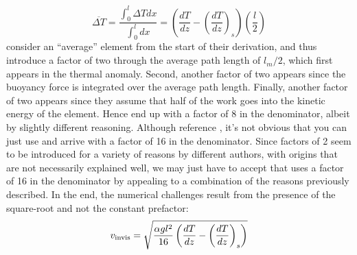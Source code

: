 \begin{equation}
\overline{\Delta T} = \frac{\int_0^l \Delta T dx}{\int_0^l dx} = \left( \frac{dT}{dz} - \left( \frac{dT}{dz} \right)_s \right) \left( \frac{l}{2} \right)
\end{equation}
\cite{KWW12} consider an ``average'' element from the start of their derivation, and thus introduce a factor of two through the average path length of $l_m/2$, which first appears in the thermal anomaly.  Second, another factor of two appears since the buoyancy force is integrated over the average path length.  Finally, another factor of two appears since they assume that half of the work goes into the kinetic energy of the element.  Hence \cite{KWW12} end up with a factor of 8 in the denominator, albeit by slightly different reasoning.  Although \cite{ABE93,ABE95} reference \cite{V53}, it's not obvious that you can just use \cite{V53} and arrive with a factor of 16 in the denominator.  Since factors of 2 seem to be introduced for a variety of reasons by different authors, with origins that are not necessarily explained well, we may just have to accept that \cite{ABE93,ABE95} uses a factor of 16 in the denominator by appealing to a combination of the reasons previously described.  In the end, the numerical challenges result from the presence of the square-root and not the constant prefactor:
\begin{equation}
v_{\rm invis} = \sqrt{\frac{\alpha g l^2}{16} \left( \frac{dT}{dz} - \left( \frac{dT}{dz} \right)_s \right)}
\end{equation}
